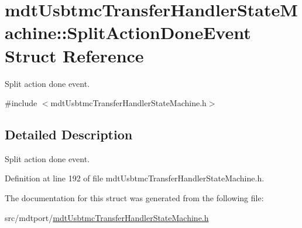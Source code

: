 \hypertarget{structmdt_usbtmc_transfer_handler_state_machine_1_1_split_action_done_event}{\section{mdt\-Usbtmc\-Transfer\-Handler\-State\-Machine\-:\-:Split\-Action\-Done\-Event Struct Reference}
\label{structmdt_usbtmc_transfer_handler_state_machine_1_1_split_action_done_event}
}


Split action done event.  




{\ttfamily \#include $<$mdt\-Usbtmc\-Transfer\-Handler\-State\-Machine.\-h$>$}



\subsection{Detailed Description}
Split action done event. 

Definition at line 192 of file mdt\-Usbtmc\-Transfer\-Handler\-State\-Machine.\-h.



The documentation for this struct was generated from the following file\-:\begin{DoxyCompactItemize}
\item 
src/mdtport/\hyperlink{mdt_usbtmc_transfer_handler_state_machine_8h}{mdt\-Usbtmc\-Transfer\-Handler\-State\-Machine.\-h}\end{DoxyCompactItemize}
